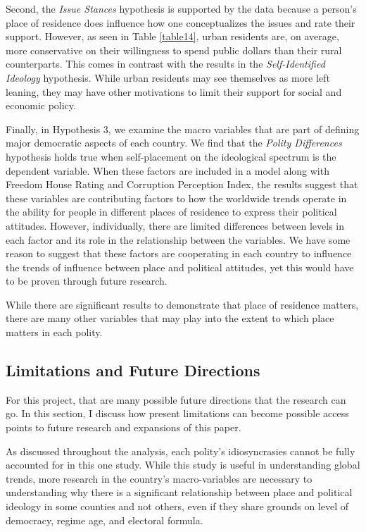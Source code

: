 \documentclass[12pt, titlepage]{article}
\newcommand\e{\emph}
\begin{document}
Second, the \e{Issue Stances} hypothesis is supported by the data because a person's place of residence does influence how one conceptualizes the issues and rate their support. However, as seen in Table \ref{table14}, urban residents are, on average, more conservative on their willingness to spend public dollars than their rural counterparts. This comes in contrast with the results in the \e{Self-Identified Ideology} hypothesis. While urban residents may see themselves as more left leaning, they may have other motivations to limit their support for social and economic policy.

Finally, in Hypothesis 3, we examine the macro variables that are part of defining major democratic aspects of each country. We find that the \e{Polity Differences} hypothesis holds true when self-placement on the ideological spectrum is the dependent variable. When these factors are included in a model along with Freedom House Rating and Corruption Perception Index, the results suggest that these variables are contributing factors to how the worldwide trends operate in the ability for people in different places of residence to express their political attitudes. However, individually, there are limited differences between levels in each factor and its role in the relationship between the variables. We have some reason to suggest that these factors are cooperating in each country to influence the trends of influence between place and political attitudes, yet this would have to be proven through future research.

While there are significant results to demonstrate that place of residence matters, there are many other variables that may play into the extent to which place matters in each polity.

\subsection{Limitations and Future Directions}

For this project, that are many possible future directions that the research can go. In this section, I discuss how present limitations can become possible access points to future research and expansions of this paper.

As discussed throughout the analysis, each polity's idiosyncrasies cannot be fully accounted for in this one study. While this study is useful in understanding global trends, more research in the country's macro-variables are necessary to understanding why there is a significant relationship between place and political ideology in some counties and not others, even if they share grounds on level of democracy, regime age, and electoral formula.
\end{document}
